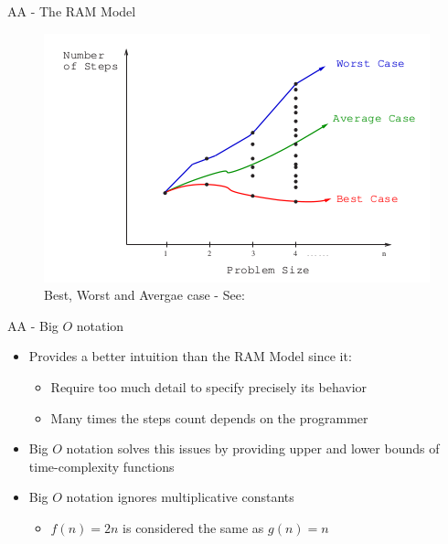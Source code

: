 \documentclass{beamer}
\begin{document}
\begin{frame}{AA - The RAM Model}
    \begin{figure}
        \centering
        \includegraphics[scale=0.5]{imgs/1-CompetitiveProgramming/best-worst-avg-case.png}
        \caption{Best, Worst and Avergae case - See: \cite{skiena}}
        \label{fig:my_label}
    \end{figure}
\end{frame}

\begin{frame}{AA - Big $O$ notation}
    \begin{itemize}
        \item Provides a better intuition than the RAM Model since it:
            \begin{itemize}
                \item Require too much detail to specify precisely its behavior
                \item Many times the steps count depends on the programmer
            \end{itemize}
        \item Big $O$ notation solves this issues by providing upper and lower bounds of time-complexity functions
        \item Big $O$ notation ignores multiplicative constants
            \begin{itemize}
                \item $f(n) = 2n$ is considered the same as $g(n) = n$
            \end{itemize}
    \end{itemize}
\end{frame}
\end{document}
